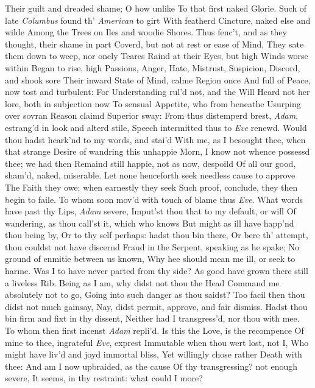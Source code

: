 \documentclass[11pt]{book}
\newcounter {first}
\begin{document}
Their guilt and dreaded shame; O how unlike 
To that first naked Glorie.  Such of late 
\textit{Columbus} found th' \textit{American} to girt 
With featherd Cincture, naked else and wilde 
Among the Trees on Iles and woodie Shores. 
Thus fenc't, and as they thought, their shame in part 
Coverd, but not at rest or ease of Mind, 
They sate them down to weep, nor onely Teares 
Raind at their Eyes, but high Winds worse within 
Began to rise, high Passions, Anger, Hate, 
Mistrust, Suspicion, Discord, and shook sore 
Their inward State of Mind, calme Region once 
And full of Peace, now tost and turbulent: 
For Understanding rul'd not, and the Will 
Heard not her lore, both in subjection now 
To sensual Appetite, who from beneathe 
Usurping over sovran Reason claimd 
Superior sway: From thus distemperd brest, 
\textit{Adam}, estrang'd in look and alterd stile, 
Speech intermitted thus to \textit{Eve} renewd. 
\quad Would thou hadst heark'nd to my words, and stai'd 
With me, as I besought thee, when that strange 
Desire of wandring this unhappie Morn, 
I know not whence possessd thee; we had then 
Remaind still happie, not as now, despoild 
Of all our good, sham'd, naked, miserable. 
Let none henceforth seek needless cause to approve 
The Faith they owe; when earnestly they seek 
Such proof, conclude, they then begin to faile. 
\quad To whom soon mov'd with touch of blame thus \textit{Eve}. 
What words have past thy Lips, \textit{Adam} severe, 
Imput'st thou that to my default, or will 
Of wandering, as thou call'st it, which who knows 
But might as ill have happ'nd thou being by, 
Or to thy self perhaps: hadst thou bin there, 
Or bere th' attempt, thou couldst not have discernd 
Fraud in the Serpent, speaking as he spake; 
No ground of enmitie between us known, 
Why hee should mean me ill, or seek to harme. 
Was I to have never parted from thy side? 
As good have grown there still a liveless Rib. 
Being as I am, why didst not thou the Head 
Command me absolutely not to go, 
Going into such danger as thou saidst? 
Too facil then thou didst not much gainsay, 
Nay, didst permit, approve, and fair dismiss. 
Hadst thou bin firm and fixt in thy dissent, 
Neither had I transgress'd, nor thou with mee. 
\quad To whom then first incenst \textit{Adam} repli'd. 
Is this the Love, is the recompence 
Of mine to thee, ingrateful \textit{Eve}, exprest 
Immutable when thou wert lost, not I, 
Who might have liv'd and joyd immortal bliss, 
Yet willingly chose rather Death with thee: 
And am I now upbraided, as the cause 
Of thy transgressing? not enough severe, 
It seems, in thy restraint: what could I more? 
\end{document}
